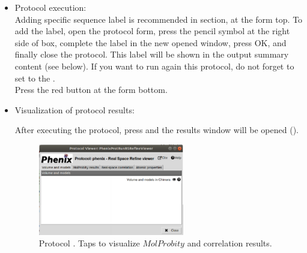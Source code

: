 \begin{itemize}
 \item Protocol execution:\\
 Adding specific sequence label is recommended in  section, at the form top. To add the label, open the protocol form, press the pencil symbol at the right side of  box, complete the label in the new opened window, press OK, and finally close the protocol. This label will be shown in the output summary content (see below). If you want to run again this protocol, do not forget to set to  the .\\
  Press the  red button at the form bottom.
  
 \item Visualization of protocol results:
 
 After executing the protocol, press  and the results window will be opened (). 
  
    \begin{figure}[H]
     \centering 
     \captionsetup{width=.7\linewidth} 
     \includegraphics[width=0.60\textwidth]{Images_appendix/Fig149.pdf}
     \caption{Protocol . Taps to visualize $MolProbity$  and  correlation results.}
     \label{fig:app_protocol_real_space_refine_2}
    \end{figure}
    

\end{itemize}
